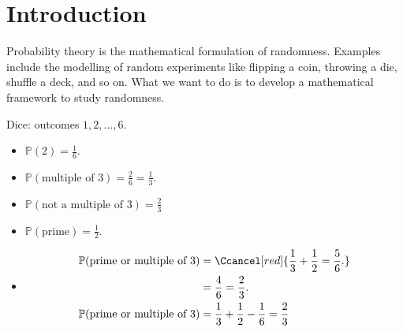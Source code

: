 \section{Introduction}
Probability theory is the mathematical formulation of randomness.
Examples include the modelling of random experiments like flipping a coin, throwing a die, shuffle a deck, and so on.
What we want to do is to develop a mathematical framework to study randomness.

\begin{example} \label{exm:0}
    Dice: outcomes $1, 2, \dots, 6$.
    \begin{itemize}
        \item $\mathbb{P}(2) = \frac{1}{6}.$
        \item $\mathbb{P}(\text{multiple of }3) = \frac{2}{6} = \frac{1}{3}.$
        \item $\mathbb{P}(\text{not a multiple of }3) = \frac{2}{3}$
        \item $\mathbb{P}(\text{prime}) = \frac{1}{2}.$
        \item \begin{align*}
            \mathbb{P}(\text{prime or multiple of 3}) &= \Ccancel[red]{\frac{1}{3} + \frac{1}{2} = \frac{5}{6}.} \\
            &= \frac{4}{6} = \frac{2}{3}. \\
            \mathbb{P}(\text{prime or multiple of 3}) &= \frac{1}{3} + \frac{1}{2} - \frac{1}{6} = \frac{2}{3}
        \end{align*} 
    \end{itemize} 
\end{example}